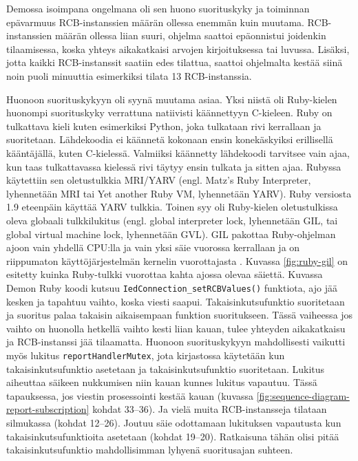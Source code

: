 Demossa isoimpana ongelmana oli sen huono suorituskyky ja toiminnan epävarmuus RCB-instanssien määrän ollessa enemmän kuin muutama. RCB-instanssien määrän ollessa liian suuri, ohjelma saattoi epäonnistui joidenkin tilaamisessa, koska yhteys aikakatkaisi arvojen kirjoituksessa tai luvussa. Lisäksi, jotta kaikki RCB-instanssit saatiin edes tilattua, saattoi ohjelmalta kestää siinä noin puoli minuuttia esimerkiksi tilata 13 RCB-instanssia.

Huonoon suorituskykyyn oli syynä muutama asiaa. Yksi niistä oli Ruby-kielen huonompi suorituskyky verrattuna natiivisti käännettyyn C-kieleen. Ruby on tulkattava kieli kuten esimerkiksi Python, joka tulkataan rivi kerrallaan ja suoritetaan. Lähdekoodia ei käännetä kokonaan ensin konekäskyiksi erillisellä kääntäjällä, kuten C-kielessä. Valmiiksi käännetty lähdekoodi tarvitsee vain ajaa, kun taas tulkattavassa kielessä rivi täytyy ensin tulkata ja sitten ajaa. Rubyssa käytettiin sen oletustulkkia MRI/YARV (engl. Matz's Ruby Interpreter, lyhennetään MRI tai Yet another Ruby VM, lyhennetään YARV). Ruby versiosta 1.9 eteenpäin käyttää YARV tulkkia. Toinen syy oli Ruby-kielen oletustulkissa oleva globaali tulkkilukitus (engl. global interpreter lock, lyhennetään GIL, tai global virtual machine lock, lyhennetään GVL). GIL pakottaa Ruby-ohjelman ajoon vain yhdellä CPU:lla ja vain yksi säie vuorossa kerrallaan ja on riippumaton käyttöjärjestelmän kernelin vuorottajasta \cite[s.~131--133]{Odaira2014}. Kuvassa \ref{fig:ruby-gil} on esitetty kuinka Ruby-tulkki vuorottaa kahta ajossa olevaa säiettä. Kuvassa Demon Ruby koodi kutsuu \texttt{IedConnection\_setRCBValues()} funktiota, ajo jää kesken ja tapahtuu vaihto, koska viesti saapui. Takaisinkutsufunktio suoritetaan ja suoritus palaa takaisin aikaisempaan funktion suoritukseen. Tässä vaiheessa jos vaihto on huonolla hetkellä vaihto kesti liian kauan, tulee yhteyden aikakatkaisu ja RCB-instanssi jää tilaamatta. Huonoon suorituskykyyn mahdollisesti vaikutti myös lukitus \texttt{reportHandlerMutex}, jota kirjastossa käytetään kun takaisinkutsufunktio asetetaan ja takaisinkutsufunktio suoritetaan. Lukitus aiheuttaa säikeen nukkumisen niin kauan kunnes lukitus vapautuu. Tässä tapauksessa, jos viestin prosessointi kestää kauan (kuvassa \ref{fig:sequence-diagram-report-subscription} kohdat 33--36). Ja vielä muita RCB-instansseja tilataan silmukassa (kohdat 12--26). Joutuu säie odottamaan lukituksen vapautusta kun takaisinkutsufunktioita asetetaan (kohdat 19--20). Ratkaisuna tähän olisi pitää takaisinkutsufunktio mahdollisimman lyhyenä suoritusajan suhteen.

